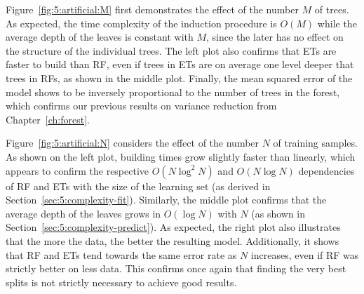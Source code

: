 Figure~\ref{fig:5:artificial:M} first demonstrates the effect of the number $M$
of trees. As expected, the time complexity of the induction procedure is
$O(M)$ while the average depth of the leaves is constant with $M$, since the
later has no effect on the structure of the individual trees. The left plot
also confirms that ETs are faster to build than RF, even if trees in ETs are on
average one level deeper that trees in RFs, as shown in the middle plot.
Finally, the mean squared error of the model shows to be inversely proportional
to the number of trees in the forest, which confirms our previous results on
variance reduction from Chapter~\ref{ch:forest}.

Figure~\ref{fig:5:artificial:N} considers the effect of the number $N$ of
training samples. As shown on the left plot, building times grow slightly
faster than linearly, which appears to confirm the respective $O(N\log^2 N)$
and $O(N\log N)$ dependencies of RF and ETs with the size of the learning set (as
derived in Section~\ref{sec:5:complexity-fit}). Similarly,  the middle plot
confirms that the average depth of the leaves grows in $O(\log N)$ with $N$ (as
shown in Section~\ref{sec:5:complexity-predict}). As expected, the right plot
also illustrates that the more the data, the better the resulting model.
Additionally, it shows that RF and ETs tend towards the same error rate as
$N$ increases, even if RF was strictly better on less data. This
confirms once again that finding the very best splits is not strictly necessary
to achieve good results.

